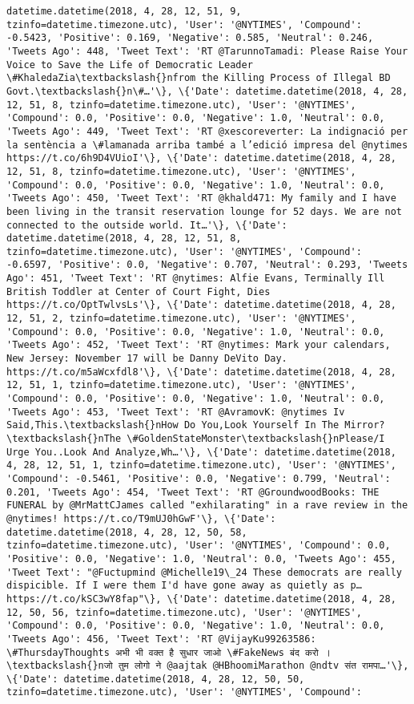 \documentclass[11pt]{article}
\begin{document}
\begin{Verbatim}[commandchars=\\\{\}]
datetime.datetime(2018, 4, 28, 12, 51, 9, tzinfo=datetime.timezone.utc), 'User': '@NYTIMES', 'Compound': -0.5423, 'Positive': 0.169, 'Negative': 0.585, 'Neutral': 0.246, 'Tweets Ago': 448, 'Tweet Text': 'RT @TarunnoTamadi: Please Raise Your Voice to Save the Life of Democratic Leader \#KhaledaZia\textbackslash{}nfrom the Killing Process of Illegal BD Govt.\textbackslash{}n\#…'\}, \{'Date': datetime.datetime(2018, 4, 28, 12, 51, 8, tzinfo=datetime.timezone.utc), 'User': '@NYTIMES', 'Compound': 0.0, 'Positive': 0.0, 'Negative': 1.0, 'Neutral': 0.0, 'Tweets Ago': 449, 'Tweet Text': 'RT @xescoreverter: La indignació per la sentència a \#lamanada arriba també a l’edició impresa del @nytimes https://t.co/6h9D4VUioI'\}, \{'Date': datetime.datetime(2018, 4, 28, 12, 51, 8, tzinfo=datetime.timezone.utc), 'User': '@NYTIMES', 'Compound': 0.0, 'Positive': 0.0, 'Negative': 1.0, 'Neutral': 0.0, 'Tweets Ago': 450, 'Tweet Text': 'RT @khald471: My family and I have been living in the transit reservation lounge for 52 days. We are not connected to the outside world. It…'\}, \{'Date': datetime.datetime(2018, 4, 28, 12, 51, 8, tzinfo=datetime.timezone.utc), 'User': '@NYTIMES', 'Compound': -0.6597, 'Positive': 0.0, 'Negative': 0.707, 'Neutral': 0.293, 'Tweets Ago': 451, 'Tweet Text': 'RT @nytimes: Alfie Evans, Terminally Ill British Toddler at Center of Court Fight, Dies https://t.co/OptTwlvsLs'\}, \{'Date': datetime.datetime(2018, 4, 28, 12, 51, 2, tzinfo=datetime.timezone.utc), 'User': '@NYTIMES', 'Compound': 0.0, 'Positive': 0.0, 'Negative': 1.0, 'Neutral': 0.0, 'Tweets Ago': 452, 'Tweet Text': 'RT @nytimes: Mark your calendars, New Jersey: November 17 will be Danny DeVito Day. https://t.co/m5aWcxfdl8'\}, \{'Date': datetime.datetime(2018, 4, 28, 12, 51, 1, tzinfo=datetime.timezone.utc), 'User': '@NYTIMES', 'Compound': 0.0, 'Positive': 0.0, 'Negative': 1.0, 'Neutral': 0.0, 'Tweets Ago': 453, 'Tweet Text': 'RT @AvramovK: @nytimes Iv Said,This.\textbackslash{}nHow Do You,Look Yourself In The Mirror?\textbackslash{}nThe \#GoldenStateMonster\textbackslash{}nPlease/I Urge You..Look And Analyze,Wh…'\}, \{'Date': datetime.datetime(2018, 4, 28, 12, 51, 1, tzinfo=datetime.timezone.utc), 'User': '@NYTIMES', 'Compound': -0.5461, 'Positive': 0.0, 'Negative': 0.799, 'Neutral': 0.201, 'Tweets Ago': 454, 'Tweet Text': 'RT @GroundwoodBooks: THE FUNERAL by @MrMattCJames called "exhilarating" in a rave review in the @nytimes! https://t.co/T9mUJ0hGwF'\}, \{'Date': datetime.datetime(2018, 4, 28, 12, 50, 58, tzinfo=datetime.timezone.utc), 'User': '@NYTIMES', 'Compound': 0.0, 'Positive': 0.0, 'Negative': 1.0, 'Neutral': 0.0, 'Tweets Ago': 455, 'Tweet Text': "@Fuctupmind @Michelle19\_24 These democrats are really dispicible. If I were them I'd have gone away as quietly as p… https://t.co/kSC3wY8fap"\}, \{'Date': datetime.datetime(2018, 4, 28, 12, 50, 56, tzinfo=datetime.timezone.utc), 'User': '@NYTIMES', 'Compound': 0.0, 'Positive': 0.0, 'Negative': 1.0, 'Neutral': 0.0, 'Tweets Ago': 456, 'Tweet Text': 'RT @VijayKu99263586: \#ThursdayThoughts अभी भी वक्त है सुधार जाओ \#FakeNews बंद करो ।\textbackslash{}nजो तुम लोगो ने @aajtak @HBhoomiMarathon @ndtv संत रामपा…'\}, \{'Date': datetime.datetime(2018, 4, 28, 12, 50, 50, tzinfo=datetime.timezone.utc), 'User': '@NYTIMES', 'Compound': 
\end{Verbatim}
\end{document}
